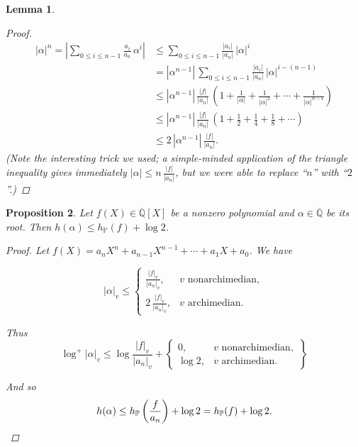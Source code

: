 \documentclass{article}
\newcommand{\QQ}{\mathbb{Q}}
\theoremstyle{myplain}
\newtheorem{proposition}{Proposition}[section]
\newtheorem{lemma}[proposition]{Lemma}
\theoremstyle{mydefinition}
\begin{document}
\begin{lemma}
\begin{proof}
    \begin{align*}
      |\alpha|^n = \left|\sum_{0 \le i \le n-1} \frac{a_i}{a_n} \, \alpha^i\right| & \le \sum_{0 \le i \le n-1} \frac{|a_i|}{|a_n|} \, |\alpha|^i\\
                                                                                   & = |\alpha^{n-1}| \, \sum_{0 \le i \le n-1} \frac{|a_i|}{|a_n|} \, |\alpha|^{i-(n-1)} \\
                                                                                   & \le |\alpha^{n-1}| \, \frac{|f|}{|a_n|} \, \left(1 + \frac{1}{|\alpha|} + \frac{1}{|\alpha|^2} + \cdots + \frac{1}{|\alpha|^{n-1}}\right) \\
                                                                                   & \le |\alpha^{n-1}| \, \frac{|f|}{|a_n|} \, \left(1 + \frac{1}{2} + \frac{1}{4} + \frac{1}{8} + \cdots\right) \\
                                                                                   & \le 2 \, |\alpha^{n-1}| \, \frac{|f|}{|a_n|}.
    \end{align*}
    (Note the interesting trick we used; a simple-minded application of the
    triangle inequality gives immediately $|\alpha| \le n \, \frac{|f|}{|a_n|}$,
    but we were able to replace ``$n$'' with ``$2$''.)
  \end{proof}
\end{lemma}

\begin{proposition}\label{proposition:root-height}
  Let $f (X) \in \overline{\QQ} [X]$ be a nonzero polynomial and
  $\alpha \in \overline{\QQ}$ be its root. Then
  $h (\alpha) \le h_\mathbb{P} (f) + \log 2$.

  \begin{proof}
    Let $f (X) = a_n X^n + a_{n-1} X^{n-1} + \cdots + a_1 X + a_0$. We have

    \[ |\alpha|_v \le
      \left\{\begin{array}{ll}
               \frac{|f|_v}{|a_n|_v}, & v \text{ nonarchimedian},\\
               2\,\frac{|f|_v}{|a_n|_v}, & v \text{ archimedian}.
             \end{array}\right. \]

    Thus
    \[ \log^+ |\alpha|_v \le \log \frac{|f|_v}{|a_n|_v} +
      \left\{\begin{array}{ll}
               0, & v \text{ nonarchimedian},\\
               \log 2, & v \text{ archimedian}.
             \end{array}\right\} \]

    And so
    \[ h (\alpha) \le h_\mathbb{P} \left(\frac{f}{a_n}\right) + \log 2 =
      h_\mathbb{P} (f) + \log 2. \qedhere \]
  \end{proof}
\end{proposition}
\end{document}
